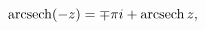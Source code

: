 \[\mathop{\mathrm{arcsech}\/}\nolimits\!\left(-z\right)=\mp\pi i+\mathop{\mathrm%
{arcsech}\/}\nolimits z,\]
